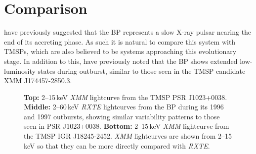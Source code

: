 \section{Comparison}

\par \citealp{Rappaport_BPHistory} have previously suggested that the BP represents a slow X-ray pulsar nearing the end of its accreting phase. As such it is natural to compare this system with TMSPs, which are also believed to be systems approaching this evolutionary stage. In addition to this, \citealp{Degenaar_174457} have previously noted that the BP shows extended low-luminosity states during outburst, similar to those seen in the TMSP candidate XMM J174457-2850.3.

\begin{figure}
 \centering
 \caption{\small \textbf{Top:} 2--15\,keV \textit{XMM} lightcurve from the TMSP PSR J1023+0038. \textbf{Middle:} 2--60\,keV \textit{RXTE} lightcurves from the BP during its 1996 and 1997 outbursts, showing similar variability patterns to those seen in PSR J1023+0038. \textbf{Bottom:} 2--15\,keV \textit{XMM} lightcurve from the TMSP IGR J18245-2452. \textit{XMM} lightcurves are shown from 2--15\,keV so that they can be more directly compared with \textit{RXTE}.}
 \label{fig:lcs}
\end{figure}

